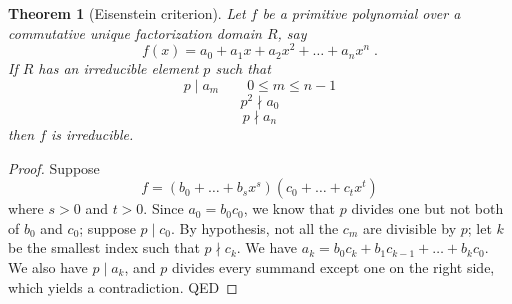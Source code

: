 \documentclass[12pt]{article}
\begin{document}

\newtheorem*{thm}{Theorem}
\begin{thm}[Eisenstein criterion]
Let $f$ be a primitive polynomial over a commutative unique factorization domain $R$, say
$$f(x)=a_0 + a_1x + a_2x^2 + \ldots + a_nx^n \;.$$
If $R$ has an irreducible element $p$ such that
$$p\mid a_m \qquad 0\le m\le n-1$$
$$p^2 \nmid a_0$$
$$p \nmid a_n$$
then $f$ is irreducible.
\end{thm}

\begin{proof}
Suppose
$$f=(b_0 + \ldots + b_s x^s)(c_0 + \ldots + c_t x^t)$$
where $s>0$ and $t>0$. Since $a_0 = b_0 c_0$, we know that $p$ divides one but not both of $b_0$ and $c_0$; suppose $p \mid c_0$. By hypothesis, not all the $c_m$ are divisible by $p$; let $k$ be the smallest index such that $p\nmid c_k$. We have $a_k = b_0 c_k + b_1 c_{k-1} + \ldots + b_k c_0$.
We also have $p\mid a_k$, and $p$ divides every summand except one on the right side, which yields a contradiction. QED
\end{proof}
\end{document}
